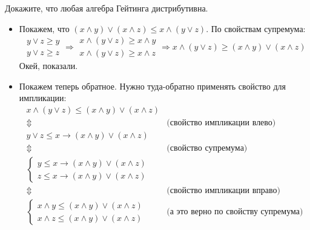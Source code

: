 \begin{task}[5]
Докажите, что любая алгебра Гейтинга дистрибутивна.
\end{task}
\begin{solution}

\begin{itemize}
	\item Покажем, что $(x \land y) \lor (x \land z) \leq x \land (y \lor z)$. По свойствам супремума:
		\[
			\begin{array}{l}
				y \lor z \geq y \\
				y \lor z \geq z
			\end{array}
			\Rightarrow
			\begin{array}{l}
				x \land (y \lor z) \geq x \land y \\
				x \land (y \lor z) \geq x \land z
			\end{array}
			\Rightarrow
			x \land (y \lor z) \geq (x \land y) \lor (x \land z)
		\]
		Окей, показали.
	\item Покажем теперь обратное. Нужно туда-обратно применять свойство для импликации:
	\[
		\begin{array}{cl}
			x \land (y \lor z) \leq (x \land y) \lor (x \land z) & \\
			\Updownarrow & \text{(свойство импликации влево)}\\
			y \lor z \leq x \rightarrow (x \land y) \lor (x \land z) & \\
			\Updownarrow & \text{(свойство супремума)}\\
			\begin{cases}
				y \leq x \rightarrow (x \land y) \lor (x \land z)\\
				z \leq x \rightarrow (x \land y) \lor (x \land z)
			\end{cases} & \\
			\Updownarrow & \text{(свойство импликации вправо)}\\
			\begin{cases}
				x \land y \leq (x \land y) \lor (x \land z)\\
				x \land z \leq (x \land y) \lor (x \land z)
			\end{cases} & \text{(а это верно по свойству супремума)} \\
		\end{array}
	\]
	\xqed
\end{itemize}
\end{solution}


